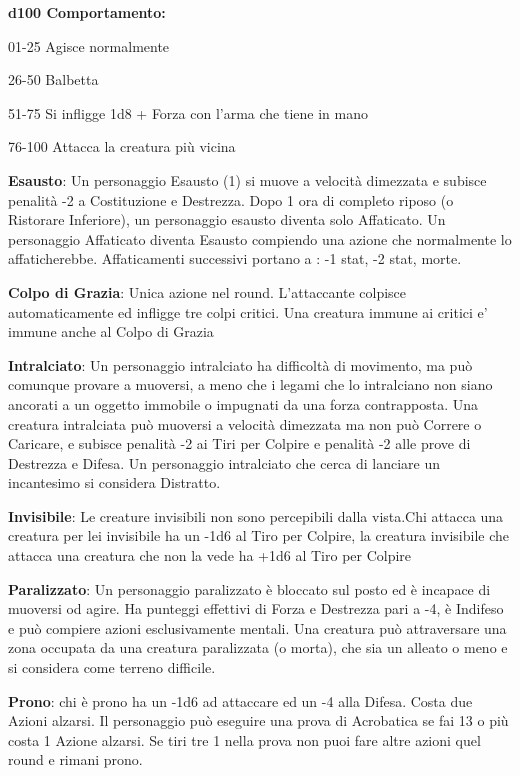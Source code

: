 \documentclass[a4paper,12 pt,openany]{book}
\begin{document}
\begin{textblock*}{19 cm}
\begin{multicols}{2}
\textbf{d100 Comportamento:}

01-25 Agisce normalmente

26-50 Balbetta

51-75 Si infligge 1d8 + Forza con l'arma che tiene in mano

76-100 Attacca la creatura più vicina

\textbf{Esausto}: Un personaggio Esausto (1) si muove a velocità dimezzata e subisce penalità -2 a Costituzione e Destrezza. Dopo 1 ora di completo riposo (o Ristorare Inferiore), un personaggio esausto diventa solo Affaticato. Un personaggio Affaticato diventa Esausto compiendo una azione che normalmente lo affaticherebbe.
Affaticamenti successivi portano a : -1 stat, -2 stat, morte.

\textbf{Colpo di Grazia}: Unica azione nel round. L'attaccante colpisce automaticamente ed infligge tre colpi critici. Una creatura immune ai critici e' immune anche al Colpo di Grazia

\textbf{Intralciato}: Un personaggio intralciato ha difficoltà di movimento, ma può comunque provare a muoversi, a meno che i legami che lo intralciano non siano ancorati a un oggetto immobile o impugnati da una forza contrapposta.
Una creatura intralciata può muoversi a velocità dimezzata ma non può Correre o Caricare, e subisce penalità -2 ai Tiri per Colpire e penalità -2 alle prove di Destrezza e Difesa.
Un personaggio intralciato che cerca di lanciare un incantesimo si considera Distratto.

\textbf{Invisibile}: Le creature invisibili non sono percepibili dalla vista.Chi attacca una creatura per lei invisibile ha un -1d6 al Tiro per Colpire, la creatura invisibile che attacca una creatura che non la vede ha +1d6 al Tiro per Colpire

\textbf{Paralizzato}: Un personaggio paralizzato è bloccato sul posto ed è incapace di muoversi od agire. Ha punteggi effettivi di Forza e Destrezza pari a -4, è Indifeso e può compiere azioni esclusivamente mentali.
Una creatura può attraversare una zona occupata da una creatura paralizzata (o morta), che sia un alleato o meno e si considera come terreno difficile.

\textbf{Prono}: chi è prono ha un -1d6 ad attaccare ed un -4 alla Difesa. Costa due Azioni alzarsi. Il personaggio può eseguire una prova di Acrobatica se fai 13 o più costa 1 Azione alzarsi. Se tiri tre 1 nella prova non puoi fare altre azioni quel round e rimani prono.



\end{multicols}
\end{textblock*}
\end{document}
